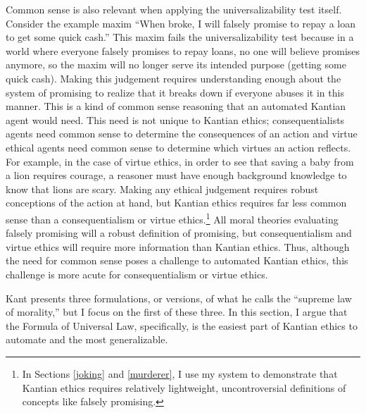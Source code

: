\begin{isabellebody}
\begin{isamarkuptext}
Common sense is also relevant when applying the universalizability test itself. Consider the example
maxim ``When broke, I will falsely promise to repay a loan
to get some quick cash.'' This maxim fails the universalizability test because in a world where everyone
falsely promises to repay loans, no one will believe promises anymore, so the maxim will no longer serve
its intended purpose (getting some quick cash). Making this judgement requires understanding enough about
the system of promising to realize that it breaks down if everyone abuses it in this manner. This is a
kind of common sense reasoning that an automated Kantian agent would need. This need is not unique to
Kantian ethics; consequentialists agents need common sense to determine the consequences of 
an action and virtue ethical agents need common sense to determine which virtues an action
reflects. For example, in the case of virtue ethics, in order to see that saving a baby from a lion 
requires courage, a reasoner must have enough background knowledge to know that lions are scary. Making any 
ethical judgement requires robust conceptions of the action at hand, but Kantian ethics requires far less common sense 
than a consequentialism or virtue ethics.\footnote{
In Sections \ref{joking} and \ref{murderer}, I use my system to demonstrate that Kantian ethics requires relatively lightweight, uncontroversial definitions 
of concepts like falsely promising.} All
moral theories evaluating falsely promising will a robust definition of promising, 
but consequentialism and virtue ethics will require more information than Kantian ethics.
Thus, although the need for common sense poses a challenge to automated
Kantian ethics, this challenge is more acute for consequentialism or virtue ethics.%
\end{isamarkuptext}\isamarkuptrue%
%
\isadelimdocument
%
\endisadelimdocument
%
\isatagdocument
%
\isamarkuptrue%
%
\endisatagdocument
{\isafolddocument}%
%
\isadelimdocument
%
\endisadelimdocument
%
\begin{isamarkuptext}%
Kant presents three formulations, or versions, 
of what he calls the ``supreme law of morality,'' but I focus on the first of these three. In this section, 
I argue that the Formula of Universal Law, specifically, is the easiest part of Kantian ethics to automate
and the most generalizable.


\end{isamarkuptext}
\end{isabellebody}
